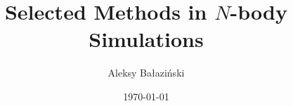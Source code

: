 \documentclass{article}
\title{Selected Methods in $N$-body Simulations}
\author{Aleksy Bałaziński}
\date{\today}
\begin{document}
\newcommand{\PThreeM}{P$^3$M}

\maketitle

\tableofcontents












\end{document}
